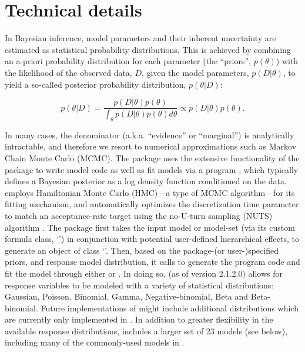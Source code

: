 \documentclass[
  shortnames]{jss}
\newcommand{\cls}[1]{`\code{#1}'}
\begin{document}
\hypertarget{technical-details}{%
\section{Technical details}\label{technical-details}}

In Bayesian inference, model parameters and their inherent uncertainty are estimated as statistical probability distributions. This is achieved by combining an a-priori probability distribution for each parameter (the ``priors'', \(p(\theta)\)) with the likelihood of the observed data, \(D\), given the model parameters, \(p(D | \theta)\), to yield a so-called posterior probability distribution, \(p(\theta | D)\):

\begin{equation*}
  p(\theta | D) = \frac{p(D | \theta) p(\theta)}{\int_{\theta} p(D | \theta) p(\theta) d \theta} \propto p(D | \theta) p(\theta).
  \label{eqn1}
\end{equation*}

In many cases, the denominator (a.k.a. ``evidence'' or ``marginal'') is analytically intractable, and therefore we resort to numerical approximations such as Markov Chain Monte Carlo (MCMC). The  package uses the extensive functionality of the  package to write model code as well as fit models via a  program \citep{stan2021}, which typically defines a Bayesian posterior as a log density function conditioned on the data.  employs Hamiltonian Monte Carlo (HMC)---a type of MCMC algorithm---for its fitting mechanism, and automatically optimizes the discretization time parameter to match an acceptance-rate target using the no-U-turn sampling (NUTS) algorithm \citep{hoffman2014}. The  package first takes the input model or model-set (via its custom formula class, \cls{bayesnecformula}) in conjunction with potential user-defined hierarchical effects, to generate an object of class \cls{brmsformula}. Then, based on the package-(or user-)specified priors, and response model distribution, it calls  \citep{Burkner2017, Burkner2018} to generate the  program code and fit the model through either  \citep{rstan2021} or  \citep{cmdstanr2022}. In doing so,  (as of version 2.1.2.0) allows for response variables to be modeled with a variety of statistical distributions: Gaussian, Poisson, Binomial, Gamma, Negative-binomial, Beta and Beta-binomial. Future implementations of  might include additional distributions which are currently only implemented in . In addition to greater flexibility in the available response distributions,  includes a larger set of 23 models (see below), including many of the commonly-used models in  \citep{Ritz2016}.
\end{document}
